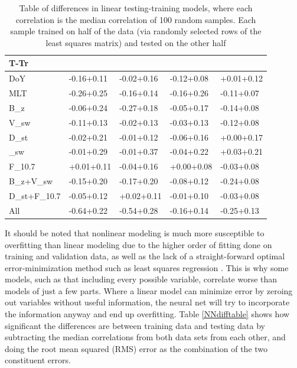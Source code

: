  \begin{table}[h]
 	\small
 	\begin{tabular}{|L|LLLL|}
 		\hline
 		T-Tr &  &  &  & \\ \hline
 		DoY & -0.16\pm+0.11 & -0.02\pm+0.16 & -0.12\pm+0.08 & +0.01\pm+0.12 \\
 		MLT & -0.26\pm+0.25 & -0.16\pm+0.14 & -0.16\pm+0.26 & -0.11\pm+0.07 \\
 		B_z & -0.06\pm+0.24 & -0.27\pm+0.18 & -0.05\pm+0.17 & -0.14\pm+0.08 \\
 		V_{sw} & -0.11\pm+0.13 & -0.02\pm+0.13 & -0.03\pm+0.13 & -0.12\pm+0.08 \\
 		D_{st} & -0.02\pm+0.21 & -0.01\pm+0.12 & -0.06\pm+0.16 & +0.00\pm+0.17 \\
 		\rho_{sw} & -0.01\pm+0.29 & -0.01\pm+0.37 & -0.04\pm+0.22 & +0.03\pm+0.21 \\
 		F_{10.7} & +0.01\pm+0.11 & -0.04\pm+0.16 & +0.00\pm+0.08 & -0.03\pm+0.08 \\
 		B_z+V_{sw} & -0.15\pm+0.20 & -0.17\pm+0.20 & -0.08\pm+0.12 & -0.24\pm+0.08 \\
 		D_{st}+F_{10.7} & -0.05\pm+0.12 & +0.02\pm+0.11 & -0.01\pm+0.10 & -0.03\pm+0.08 \\
 		All & -0.64\pm+0.22 & -0.54\pm+0.28 & -0.16\pm+0.14 & -0.25\pm+0.13 \\
 		\hline
 	\end{tabular}
 	\caption{Table of differences in linear testing-training models, where each correlation is the median correlation of 100 random samples. Each sample trained on half of the data (via randomly selected rows of the least squares matrix) and tested on the other half} 
 	\label{CCdifftable}
 \end{table}

  
 

It should be noted that nonlinear modeling is much more susceptible to overfitting than linear modeling  due to the higher order of fitting done on training and validation data, as well as the lack of a straight-forward optimal error-minimization method such as least squares regression . This is why some models, such as that including every possible variable, correlate worse than models of just a few parts. Where a linear model can minimize error by zeroing out variables without useful information, the neural net will try to incorporate the information anyway and end up overfitting. Table \ref{NNdifftable} shows how significant the differences are between training data and testing data by subtracting the median correlations from both data sets from each other, and doing the root mean squared (RMS) error as the combination of the two constituent errors.



